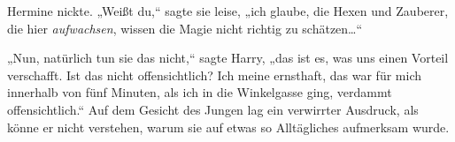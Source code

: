 Hermine nickte. „Weißt du,“ sagte sie leise, „ich glaube, die Hexen und Zauberer, die hier \emph{aufwachsen}, wissen die Magie nicht richtig zu schätzen…“

„Nun, natürlich tun sie das nicht,“ sagte Harry, „das ist es, was uns einen Vorteil verschafft. Ist das nicht offensichtlich? Ich meine ernsthaft, das war für mich innerhalb von fünf Minuten, als ich in die Winkelgasse ging, verdammt offensichtlich.“ Auf dem Gesicht des Jungen lag ein verwirrter Ausdruck, als könne er nicht verstehen, warum sie auf etwas so Alltägliches aufmerksam wurde.

